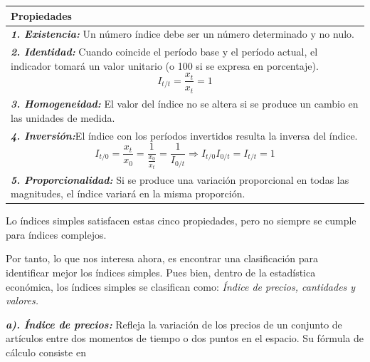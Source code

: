 \documentclass[
]{book}
\begin{document}
\begin{longtable}[]{@{}l@{}}
\toprule
\begin{minipage}[b]{0.97\columnwidth}\raggedright
Propiedades\strut
\end{minipage}\tabularnewline
\midrule
\endhead
\begin{minipage}[t]{0.97\columnwidth}\raggedright
\textbf{\emph{1. Existencia:}} Un número índice debe ser un número determinado y no nulo.\strut
\end{minipage}\tabularnewline
\begin{minipage}[t]{0.97\columnwidth}\raggedright
\textbf{\emph{2. Identidad:}} Cuando coincide el período base y el período actual, el indicador tomará un valor unitario (o 100 si se expresa en porcentaje).\[I_{t/t}=\frac{x_t}{x_t}=1\]\strut
\end{minipage}\tabularnewline
\begin{minipage}[t]{0.97\columnwidth}\raggedright
\textbf{\emph{3. Homogeneidad:}} El valor del índice no se altera si se produce un cambio en las unidades de medida.\strut
\end{minipage}\tabularnewline
\begin{minipage}[t]{0.97\columnwidth}\raggedright
\textbf{\emph{4. Inversión:}}El índice con los períodos invertidos resulta la inversa del índice.\[I_{t/0}=\frac{x_t}{x_0}=\frac{1}{\frac{x_0}{x_t}}=\frac{1}{I_{0/t}}\Longrightarrow I_{t/0}I_{0/t}=I_{t/t}=1\]\strut
\end{minipage}\tabularnewline
\begin{minipage}[t]{0.97\columnwidth}\raggedright
\textbf{\emph{5. Proporcionalidad:}} Si se produce una variación proporcional en todas las magnitudes, el índice variará en la misma proporción.\strut
\end{minipage}\tabularnewline
\bottomrule
\end{longtable}

Lo índices simples satisfacen estas cinco propiedades, pero no siempre se cumple para índices complejos.

Por tanto, lo que nos interesa ahora, es encontrar una clasificación para identificar mejor los índices simples. Pues bien, dentro de la estadística económica, los índices simples se clasifican como: \emph{Índice de precios, cantidades y valores.}

\textbf{\emph{a). Índice de precios:}} Refleja la variación de los precios de un conjunto de artículos entre dos momentos de tiempo o dos puntos en el espacio. Su fórmula de cálculo consiste en
\end{document}
